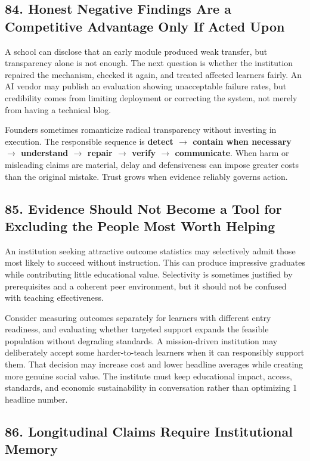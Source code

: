 \subsection*{84. Honest Negative Findings Are a Competitive Advantage Only If Acted Upon}

A school can disclose that an early module produced weak transfer, but transparency alone is not enough. The next question is whether the institution repaired the mechanism, checked it again, and treated affected learners fairly. An AI vendor may publish an evaluation showing unacceptable failure rates, but credibility comes from limiting deployment or correcting the system, not merely from having a technical blog.

Founders sometimes romanticize radical transparency without investing in execution. The responsible sequence is \textbf{detect $\to$ contain when necessary $\to$ understand $\to$ repair $\to$ verify $\to$ communicate}. When harm or misleading claims are material, delay and defensiveness can impose greater costs than the original mistake. Trust grows when evidence reliably governs action.

\subsection*{85. Evidence Should Not Become a Tool for Excluding the People Most Worth Helping}

An institution seeking attractive outcome statistics may selectively admit those most likely to succeed without instruction. This can produce impressive graduates while contributing little educational value. Selectivity is sometimes justified by prerequisites and a coherent peer environment, but it should not be confused with teaching effectiveness.

Consider measuring outcomes separately for learners with different entry readiness, and evaluating whether targeted support expands the feasible population without degrading standards. A mission-driven institution may deliberately accept some harder-to-teach learners when it can responsibly support them. That decision may increase cost and lower headline averages while creating more genuine social value. The institute must keep educational impact, access, standards, and economic sustainability in conversation rather than optimizing 1 headline number.

\subsection*{86. Longitudinal Claims Require Institutional Memory}

